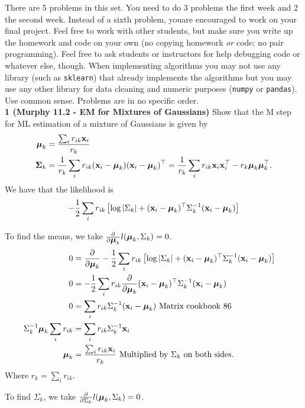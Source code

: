 \documentclass[12pt,letterpaper,fleqn]{hmcpset}
\begin{document}
There are 5 problems in this set. You need to do 3 problems the first week and 2 the second
week. Instead of a sixth problem, youare encouraged to work on your final project.
Feel free to work with other students, but make sure you write up the homework
and code on your own (no copying homework \textit{or} code; no pair programming).
Feel free to ask students or instructors for help debugging code or whatever else,
though.
When implementing algorithms you may not use any library (such as \texttt{sklearn})
that already implements the algorithms but you may use any other library for
data cleaning and numeric purposes (\texttt{numpy} or \texttt{pandas}). Use common
sense. Problems are in no specific order.\\[1em]

\textbf{1 (Murphy 11.2 - EM for Mixtures of Gaussians)} Show that the M step for ML
estimation of a mixture of Gaussians is given by
\begin{align*}
    \hbox{\boldmath$\mu$}_k &= \frac{\sum_i r_{ik}{\bf x}_i}{r_k}\\
    \hbox{\boldmath$\Sigma$}_k &= \frac{1}{r_k}\sum_i r_{ik}({\bf x}_i - \hbox{\boldmath$\mu$}_k)({\bf x}_i - \hbox{\boldmath$\mu$}_k)^\top = \frac{1}{r_k}\sum_i r_{ik}{\bf x}_i{\bf x}_i^\top - r_k\hbox{\boldmath$\mu$}_k\hbox{\boldmath$\mu$}_k^\top.
\end{align*}
\vspace{15mm}
We have that the likelihood is $$ -\frac{1}{2} \sum_i r_{ik} \left[ \log|\Sigma_k| + ({\bf x}_i - \hbox{\boldmath$\mu$}_k)^\top \Sigma_k^{-1} ({\bf x}_i - \hbox{\boldmath$\mu$}_k) \right] $$

To find the means, we take $\frac{\partial}{\partial \hbox{\boldmath$\mu$}_k} l(\hbox{\boldmath$\mu$}_k, \Sigma_k) = 0$.
\begin{align*}
	0 &= \frac{\partial}{\partial \hbox{\boldmath$\mu$}_k} -\frac{1}{2} \sum_i r_{ik} \left[ \log|\Sigma_k| + ({\bf x}_i - \hbox{\boldmath$\mu$}_k)^\top \Sigma_k^{-1} ({\bf x}_i - \hbox{\boldmath$\mu$}_k) \right] \\
	0 &= -\frac{1}{2}  \sum_i r_{ik} \frac{\partial}{\partial \hbox{\boldmath$\mu$}_k} ({\bf x}_i - \hbox{\boldmath$\mu$}_k)^\top \Sigma_k^{-1} ({\bf x}_i - \hbox{\boldmath$\mu$}_k) &\\
	0 &= \sum_i r_{ik} \Sigma_{k}^{-1} ({\bf x}_i - \hbox{\boldmath$\mu$}_k) \text{  Matrix cookbook 86}\\
    \Sigma_{k}^{-1} \hbox{\boldmath$\mu$}_k \sum_i r_{ik} &= \sum_i r_{ik} \Sigma_{k}^{-1} {\bf x}_i \\
    \hbox{\boldmath$\mu$}_k &= \frac{\sum_i r_{ik}{\bf x}_i}{r_k} \text{ Multiplied by $\Sigma_{k}$ on both sides. }
\end{align*} 
Where $r_k =\sum_i r_{ik} $.

To find $\Sigma_k$, we take $\frac{\partial}{\partial \Sigma_k} l(\hbox{\boldmath$\mu$}_k, \Sigma_k) = 0$.
\end{document}
